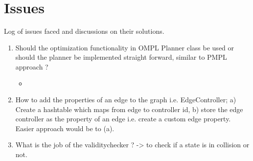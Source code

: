 \section{Issues}
Log of issues faced and discussions on their solutions.

\begin{enumerate}
 \item Should the optimization functionality in OMPL Planner class be used or should the planner be implemented straight forward, similar to PMPL approach ?
    \begin{itemize}
     \item 
    \end{itemize}
\item How to add the properties of an edge to the graph i.e. EdgeController; a) Create a hashtable which maps from edge to controller id, b) store the edge controller as the property of an edge i.e. create a custom edge property. Easier approach would be to (a).

 \item What is the job of the validitychecker ? -> to check if a state is in collision or not. 

\end{enumerate}
